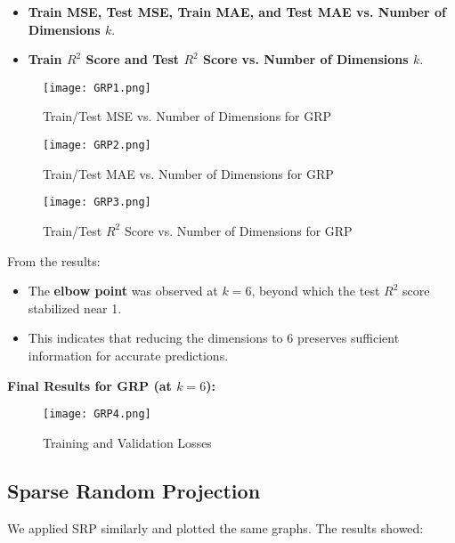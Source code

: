\documentclass[conference]{IEEEtran}
\begin{document}
\begin{itemize}
    \item \textbf{Train MSE, Test MSE, Train MAE, and Test MAE vs. Number of Dimensions \(k\)}.
    \item \textbf{Train \(R^2\) Score and Test \(R^2\) Score vs. Number of Dimensions \(k\)}.
\end{itemize}
\vspace{-0.3cm}
\begin{figure}[H]
    \centering
    \texttt{[image: GRP1.png]}
    \caption{Train/Test MSE vs. Number of Dimensions for GRP}
    \label{fig:grp_mse_mae}
\end{figure}
\vspace{-0.3cm}
\begin{figure}[H]
    \centering
    \texttt{[image: GRP2.png]}
    \caption{Train/Test MAE vs. Number of Dimensions for GRP}
    \label{fig:grp_mse_mae}
\end{figure}
\vspace{-0.6cm}
\begin{figure}[H]
    \centering
    \texttt{[image: GRP3.png]}
    \caption{Train/Test \(R^2\) Score vs. Number of Dimensions for GRP}
    \label{fig:grp_r2}
\end{figure}
\vspace{-0.3cm}
From the results:
\begin{itemize}
    \item The \textbf{elbow point} was observed at \(k = 6\), beyond which the test \(R^2\) score stabilized near 1.
    \item This indicates that reducing the dimensions to 6 preserves sufficient information for accurate predictions.
\end{itemize}

\textbf{Final Results for GRP (at \(k = 6\)):}
\vspace{-0.3cm}
\begin{figure}[H]
\centering
\texttt{[image: GRP4.png]}
\caption{Training and Validation Losses}
\label{fig:train_val_losses}
\end{figure}
\vspace{-0.3cm}
\subsection{Sparse Random Projection}
We applied SRP similarly and plotted the same graphs. The results showed:
\end{document}
